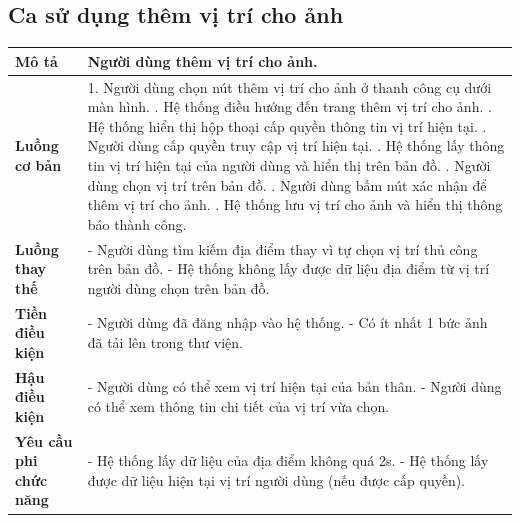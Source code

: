 \subsection{Ca sử dụng thêm vị trí cho ảnh}

\vspace{0.5cm}

\noindent 
\begin{tabularx}{\linewidth}{| l | X |} 
\hline 
\textbf{Mô tả} & Người dùng thêm vị trí cho ảnh. \\
\hline 
\textbf{Luồng cơ bản} & 1. Người dùng chọn nút thêm vị trí cho ảnh ở thanh công cụ dưới màn hình. \newline
                       2. Hệ thống điều hướng đến trang thêm vị trí cho ảnh. \newline
                       3. Hệ thống hiển thị hộp thoại cấp quyền thông tin vị trí hiện tại. \newline
                       4. Người dùng cấp quyền truy cập vị trí hiện tại. \newline
                       5. Hệ thống lấy thông tin vị trí hiện tại của người dùng và hiển thị trên bản đồ. \newline
                       6. Người dùng chọn vị trí trên bản đồ. \newline
                       7. Người dùng bấm nút xác nhận để thêm vị trí cho ảnh. \newline
                       8. Hệ thống lưu vị trí cho ảnh và hiển thị thông báo thành công. \\
\hline
\textbf{Luồng thay thế} & - Người dùng tìm kiếm địa điểm thay vì tự chọn vị trí thủ công trên bản đồ. \newline
                          - Hệ thống không lấy được dữ liệu địa điểm từ vị trí người dùng chọn trên bản đồ. \\
\hline
\textbf{Tiền điều kiện} & - Người dùng đã đăng nhập vào hệ thống. \newline
                          - Có ít nhất 1 bức ảnh đã tải lên trong thư viện. \\
\hline
\textbf{Hậu điều kiện} & - Người dùng có thể xem vị trí hiện tại của bản thân. \newline
                          - Người dùng có thể xem thông tin chi tiết của vị trí vừa chọn. \\
\hline 
\textbf{Yêu cầu phi chức năng} & - Hệ thống lấy dữ liệu của địa điểm không quá 2s. \newline
                           - Hệ thống lấy được dữ liệu hiện tại vị trí người dùng (nếu được cấp quyền). \\
\hline 
\end{tabularx}

